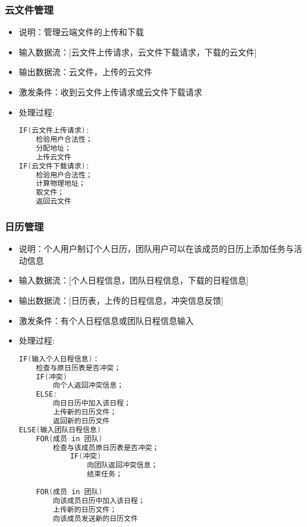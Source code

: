             \subsubsection{云文件管理}
            \begin{itemize}
                \item 说明：管理云端文件的上传和下载
                \item 输入数据流：[云文件上传请求，云文件下载请求，下载的云文件]
                \item 输出数据流：云文件，上传的云文件
                \item 激发条件：收到云文件上传请求或云文件下载请求
                \item 处理过程: 
\begin{lstlisting}[language=C, caption=云文件管理, label={code:first-code}]
IF(云文件上传请求):
    检验用户合法性；
    分配地址；
    上传云文件
IF(云文件下载请求):
    检验用户合法性；
    计算物理地址；
    取文件；
    返回云文件
\end{lstlisting}
            \end{itemize}
            \subsubsection{日历管理}
            \begin{itemize}
                \item 说明：个人用户制订个人日历，团队用户可以在该成员的日历上添加任务与活动信息
                \item 输入数据流：[个人日程信息，团队日程信息，下载的日程信息]
                \item 输出数据流：[日历表，上传的日程信息，冲突信息反馈]
                \item 激发条件：有个人日程信息或团队日程信息输入
                \item 处理过程:
\begin{lstlisting}[language=C, caption=日历管理, label={code:first-code}]
IF(输入个人日程信息)：
    检查与原日历表是否冲突；
    IF(冲突) 
        向个人返回冲突信息；
    ELSE:
        向日日历中加入该日程；
        上传新的日历文件；
        返回新的日历文件
ELSE(输入团队日程信息)
    FOR(成员 in 团队)
        检查与该成员原日历表是否冲突；
            IF(冲突) 
                向团队返回冲突信息；
                结束任务；
                    
    FOR(成员 in 团队)
        向该成员日历中加入该日程；
        上传新的日历文件；
        向该成员发送新的日历文件
\end{lstlisting}
            \end{itemize}
